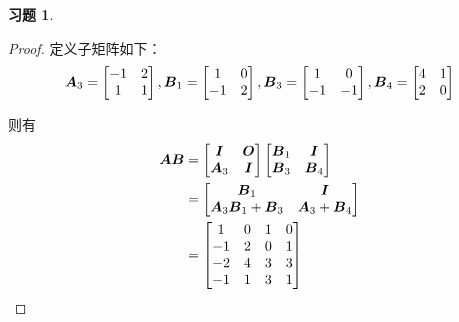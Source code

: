 \documentclass{ctexart}
\newtheorem{problem}{习题}[section]
\begin{document}
\begin{problem}
\end{problem}
\begin{proof}
    定义子矩阵如下：
    \begin{equation*}
        \boldsymbol{A}_3=
        \begin{bmatrix}
            -1 & 2 \\1&1
        \end{bmatrix},
        \boldsymbol{B}_1=
        \begin{bmatrix}
            1 & 0 \\-1&2
        \end{bmatrix},
        \boldsymbol{B}_3=
        \begin{bmatrix}
            1 & 0 \\-1&-1
        \end{bmatrix},
        \boldsymbol{B}_4=
        \begin{bmatrix}
            4 & 1 \\2&0
        \end{bmatrix}
    \end{equation*}

    则有
    \begin{align*}
        \boldsymbol{A}\boldsymbol{B} & =
        \begin{bmatrix}
            \boldsymbol{I} & \boldsymbol{O} \\\boldsymbol{A}_3&\boldsymbol{I}
        \end{bmatrix}
        \begin{bmatrix}
            \boldsymbol{B}_1 & \boldsymbol{I} \\\boldsymbol{B}_3&\boldsymbol{B}_4
        \end{bmatrix} \\&=
        \begin{bmatrix}
            \boldsymbol{B}_1 & \boldsymbol{I} \\\boldsymbol{A}_3\boldsymbol{B}_1+\boldsymbol{B}_3&\boldsymbol{A}_3+\boldsymbol{B}_4
        \end{bmatrix} \\&=
        \begin{bmatrix}
            1  & 0 & 1 & 0 \\
            -1 & 2 & 0 & 1 \\
            -2 & 4 & 3 & 3 \\
            -1 & 1 & 3 & 1
        \end{bmatrix}
    \end{align*}
\end{proof}
\end{document}
